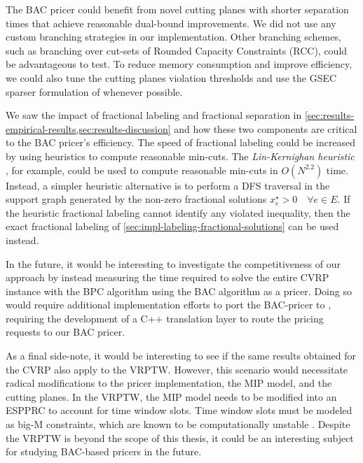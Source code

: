 The BAC pricer could benefit from novel cutting planes with shorter separation times that achieve reasonable dual-bound improvements.
We did not use any custom branching strategies in our implementation.
Other branching schemes, such as branching over cut-sets of Rounded Capacity Constraints (RCC), could be advantageous to test.
To reduce memory consumption and improve efficiency, we could also tune the cutting planes violation thresholds and use the GSEC sparser formulation of  whenever possible.

We saw the impact of fractional labeling and fractional separation in \cref{sec:results-empirical-results,sec:results-discussion} and how these two components are critical to the BAC pricer's efficiency.
The speed of fractional labeling could be increased by using heuristics to compute reasonable min-cuts.
The \textit{Lin-Kernighan heuristic} \parencite{kernighan1970}, for example, could be used to compute reasonable min-cuts in $O(N^{2.2})$ time.
Instead, a simpler heuristic alternative is to perform a DFS traversal in the support graph generated by the non-zero fractional solutions $x^\star_e > 0 \quad \forall e \in E$.
If the heuristic fractional labeling cannot identify any violated inequality, then the exact fractional labeling of \cref{sec:impl-labeling-fractional-solutions} can be used instead.

\medskip

In the future, it would be interesting to investigate the competitiveness of our approach by instead measuring the time required to solve the entire CVRP instance with the BPC algorithm using the BAC algorithm as a pricer.
Doing so would require additional implementation efforts to port the BAC-pricer to \bapcod{}, requiring the development of a C++ translation layer to route the \bapcod{} pricing requests to our BAC pricer.

As a final side-note, it would be interesting to see if the same results obtained for the CVRP also apply to the VRPTW.
However, this scenario would necessitate radical modifications to the pricer implementation, the MIP model, and the cutting planes.
In the VRPTW, the MIP model needs to be modified into an ESPPRC to account for time window slots.
Time window slots must be modeled as big-M constraints, which are known to be computationally unstable \parencite{jepsen2008branchandcut}.
Despite the VRPTW is beyond the scope of this thesis, it could be an interesting subject for studying BAC-based pricers in the future.
